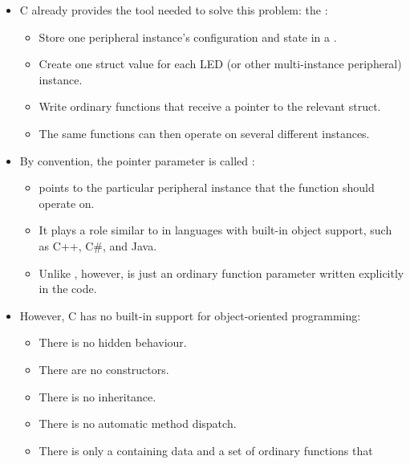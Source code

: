 \begin{itemize}
  \begin{itemize}
    \item {} contains an exercise with five LEDs, Exercise~\ref{c4:ex:7}.
    \item Without a better abstraction, adding another LED means copying an entire family of
      macros or functions and renaming them.
    \item That quickly becomes repetitive, difficult to maintain, and easy to get wrong.
  \end{itemize}
  \item C already provides the tool needed to solve this problem: the :
  \begin{itemize}
    \item Store one peripheral instance's configuration and state in a .
    \item Create one struct value for each LED (or other multi-instance peripheral) instance.
    \item Write ordinary functions that receive a pointer to the relevant struct.
    \item The same functions can then operate on several different instances.
  \end{itemize}
  \item By convention, the pointer parameter is called :
  \begin{itemize}
    \item {} points to the particular peripheral instance that the function should
      operate on.
    \item It plays a role similar to  in languages with built-in object support, such
      as C++, C\#, and Java.
    \item Unlike , however,  is just an ordinary function parameter written
      explicitly in the code.
  \end{itemize}
  \item However, C has no built-in support for object-oriented programming:
  \begin{itemize}
    \item There is no hidden behaviour.
    \item There are no constructors.
    \item There is no inheritance.
    \item There is no automatic method dispatch.
    \item There is only a  containing data and a set of ordinary functions that

\end{itemize}
\end{itemize}

